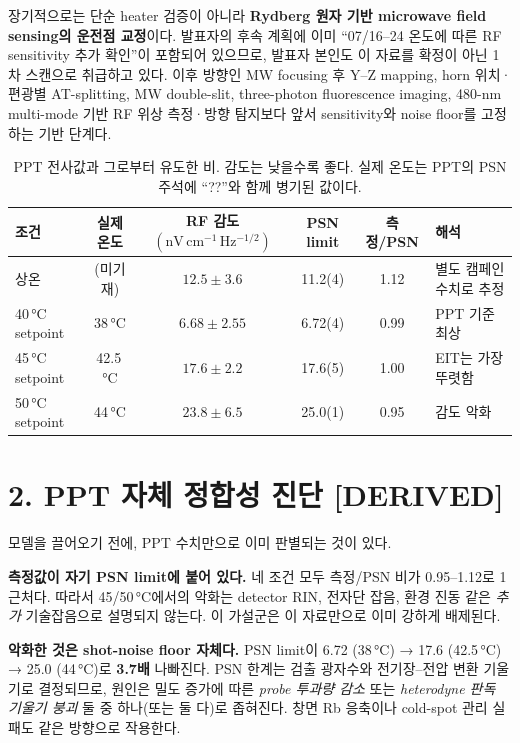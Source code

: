 \documentclass[10pt,a4paper]{article}
\newcommand{\Status}[1]{\textsf{\footnotesize[#1]}}
\newcommand{\sensunit}{\mathrm{nV\,cm^{-1}\,Hz^{-1/2}}}
\begin{document}
장기적으로는 단순 heater 검증이 아니라 \textbf{Rydberg 원자 기반 microwave field sensing의
운전점 교정}이다. 발표자의 후속 계획에 이미 ``07/16--24 온도에 따른 RF sensitivity 추가 확인''이
포함되어 있으므로, 발표자 본인도 이 자료를 확정이 아닌 1차 스캔으로 취급하고 있다. 이후 방향인
MW focusing 후 Y--Z mapping, horn 위치·편광별 AT-splitting, MW double-slit,
three-photon fluorescence imaging, 480-nm multi-mode 기반 RF 위상 측정·방향 탐지보다 앞서
sensitivity와 noise floor를 고정하는 기반 단계다.

\begin{table}[h]
\centering
\small
\caption{PPT 전사값과 그로부터 유도한 비. 감도는 낮을수록 좋다. 실제 온도는 PPT의 PSN
주석에 ``??''와 함께 병기된 값이다.}
\begin{tabular}{lccccl}
\toprule
조건 & 실제 온도 & RF 감도 \((\sensunit)\) & PSN limit & 측정/PSN & 해석\\
\midrule
상온 & (미기재) & \(12.5\pm3.6\) & 11.2(4) & 1.12 & 별도 캠페인 수치로 추정\\
40\,°C setpoint & 38\,°C & \(\mathbf{6.68\pm2.55}\) & 6.72(4) & 0.99 & PPT 기준 최상\\
45\,°C setpoint & 42.5\,°C & \(17.6\pm2.2\) & 17.6(5) & 1.00 & EIT는 가장 뚜렷함\\
50\,°C setpoint & 44\,°C & \(23.8\pm6.5\) & 25.0(1) & 0.95 & 감도 악화\\
\bottomrule
\end{tabular}
\end{table}

\section*{2. PPT 자체 정합성 진단 \Status{DERIVED}}

모델을 끌어오기 전에, PPT 수치만으로 이미 판별되는 것이 있다.

\textbf{측정값이 자기 PSN limit에 붙어 있다.} 네 조건 모두 측정/PSN 비가 0.95--1.12로 1 근처다.
따라서 45/50\,°C에서의 악화는 detector RIN, 전자단 잡음, 환경 진동 같은 \emph{추가} 기술잡음으로
설명되지 않는다. 이 가설군은 이 자료만으로 이미 강하게 배제된다.

\textbf{악화한 것은 shot-noise floor 자체다.} PSN limit이 6.72 (38\,°C) → 17.6 (42.5\,°C)
→ 25.0 (44\,°C)로 \textbf{3.7배} 나빠진다. PSN 한계는 검출 광자수와 전기장--전압 변환 기울기로
결정되므로, 원인은 밀도 증가에 따른 \emph{probe 투과량 감소} 또는 \emph{heterodyne 판독 기울기 붕괴}
둘 중 하나(또는 둘 다)로 좁혀진다. 창면 Rb 응축이나 cold-spot 관리 실패도 같은 방향으로 작용한다.
\end{document}
